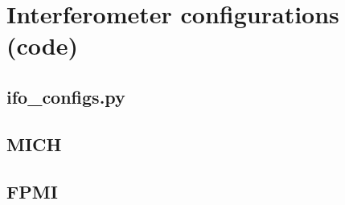 













\section{Interferometer configurations (code)}
\subsection{ifo\_configs.py}


\subsection{MICH}


\subsection{FPMI}


